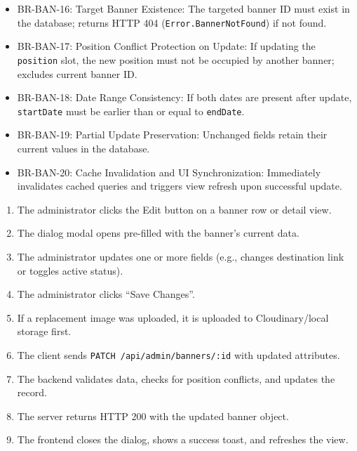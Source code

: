 \begin{itemize}[leftmargin=1.6em,topsep=3pt,itemsep=2pt,parsep=0pt,label=$\bullet$]\brrulelist
    \item BR-BAN-16: Target Banner Existence: The targeted banner ID must exist in the database; returns HTTP 404 (\texttt{Error.BannerNotFound}) if not found.
    \item BR-BAN-17: Position Conflict Protection on Update: If updating the \texttt{position} slot, the new position must not be occupied by another banner; excludes current banner ID.
    \item BR-BAN-18: Date Range Consistency: If both dates are present after update, \texttt{startDate} must be earlier than or equal to \texttt{endDate}.
    \item BR-BAN-19: Partial Update Preservation: Unchanged fields retain their current values in the database.
    \item BR-BAN-20: Cache Invalidation and UI Synchronization: Immediately invalidates cached queries and triggers view refresh upon successful update.
\end{itemize}

\begin{enumerate}[leftmargin=1.6em,topsep=3pt,itemsep=2pt,parsep=0pt]
    \item The administrator clicks the Edit button on a banner row or detail view.
    \item The dialog modal opens pre-filled with the banner's current data.
    \item The administrator updates one or more fields (e.g., changes destination link or toggles active status).
    \item The administrator clicks ``Save Changes''.
    \item If a replacement image was uploaded, it is uploaded to Cloudinary/local storage first.
    \item The client sends \texttt{PATCH /api/admin/banners/:id} with updated attributes.
    \item The backend validates data, checks for position conflicts, and updates the record.
    \item The server returns HTTP 200 with the updated banner object.
    \item The frontend closes the dialog, shows a success toast, and refreshes the view.
\end{enumerate}

